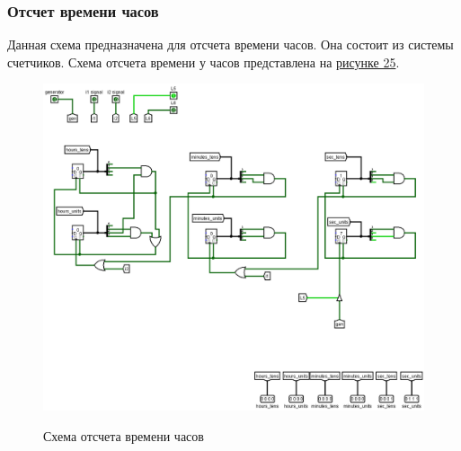 \documentclass[10pt,a4paper,final]{article} %
\begin{document}
\subsubsection{Отсчет времени часов}
Данная схема предназначена для отсчета времени часов. Она состоит из системы счетчиков.  
Схема отсчета времени у часов представлена на \hyperref[clock]{рисунке 25}.
\newpage
\begin{figure}[htpb]
	\centering
	\includegraphics[scale=0.4]{logisim/img/clock.png}
	\label{clock} 
	\caption{Схема отсчета времени часов }
\end{figure}
\end{document}
